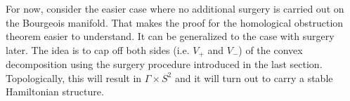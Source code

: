 For now, consider the easier case where no additional surgery is carried out on the Bourgeois manifold.
That makes the proof for the homological obstruction theorem easier to understand.
It can be generalized to the case with surgery later.
The idea is to cap off both sides (i.e. $V_+$ and $V_-$) of the convex decomposition
using the surgery procedure introduced in the last section.
Topologically, this will result in $\Gamma \times S^2$ and 
it will turn out to carry a stable Hamiltonian structure.

